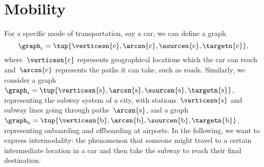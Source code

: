 
\section{Mobility}

For a specific mode of transportation, say a car, we can define a graph
\begin{equation*}
    \graph_\mathrm{c}=\tup{
        \verticesn{\mathrm{c}},
        \arcsn{\mathrm{c}},
        \sourcen{\mathrm{c}},
        \targetn{\mathrm{c}}
    },
\end{equation*}
where~$\verticesn{\mathrm{c}}$ represents geographical locations which the car can reach and~$\arcsn{\mathrm{c}}$ represents the paths it can take, such as roads.
Similarly, we consider a graph~$\graph_\mathrm{s}=\tup{\verticesn{\mathrm{s}},\arcsn{\mathrm{s}},\sourcen{\mathrm{s}},\targetn{\mathrm{s}}}$, representing the subway system of a city, with stations~$\verticesn{\mathrm{s}}$ and subway lines going through paths~$\arcsn{\mathrm{s}}$, and a graph~$\graph_\mathrm{b}=\tup{\verticesn{\mathrm{b}},\arcsn{\mathrm{b}},\sourcen{\mathrm{b}},\targetn{\mathrm{b}}}$, representing onboarding and offboarding at airports.
In the following, we want to express intermodality: the phenomenon that someone might travel to a certain intermediate location in a car and then take the subway to reach their final destination.

